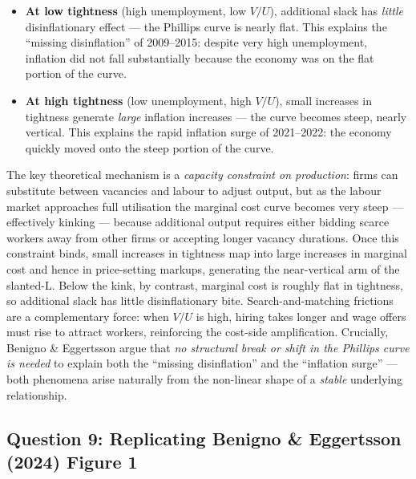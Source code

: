 \documentclass[
  12pt,
]{article}
\providecommand{\tightlist}{%
  \setlength{\itemsep}{0pt}\setlength{\parskip}{0pt}}
\begin{document}
\begin{itemize}
\tightlist
\item
  \textbf{At low tightness} (high unemployment, low \(V/U\)), additional
  slack has \emph{little} disinflationary effect --- the Phillips curve
  is nearly flat. This explains the ``missing disinflation'' of
  2009--2015: despite very high unemployment, inflation did not fall
  substantially because the economy was on the flat portion of the
  curve.
\item
  \textbf{At high tightness} (low unemployment, high \(V/U\)), small
  increases in tightness generate \emph{large} inflation increases ---
  the curve becomes steep, nearly vertical. This explains the rapid
  inflation surge of 2021--2022: the economy quickly moved onto the
  steep portion of the curve.
\end{itemize}

The key theoretical mechanism is a \emph{capacity constraint on
production}: firms can substitute between vacancies and labour to adjust
output, but as the labour market approaches full utilisation the
marginal cost curve becomes very steep --- effectively kinking ---
because additional output requires either bidding scarce workers away
from other firms or accepting longer vacancy durations. Once this
constraint binds, small increases in tightness map into large increases
in marginal cost and hence in price-setting markups, generating the
near-vertical arm of the slanted-L. Below the kink, by contrast,
marginal cost is roughly flat in tightness, so additional slack has
little disinflationary bite. Search-and-matching frictions are a
complementary force: when \(V/U\) is high, hiring takes longer and wage
offers must rise to attract workers, reinforcing the cost-side
amplification. Crucially, Benigno \& Eggertsson argue that \emph{no
structural break or shift in the Phillips curve is needed} to explain
both the ``missing disinflation'' and the ``inflation surge'' --- both
phenomena arise naturally from the non-linear shape of a \emph{stable}
underlying relationship.

\newpage

\hypertarget{question-9-replicating-benigno-eggertsson-2024-figure-1}{%
\subsection{Question 9: Replicating Benigno \& Eggertsson (2024) Figure
1}\label{question-9-replicating-benigno-eggertsson-2024-figure-1}}
\end{document}
